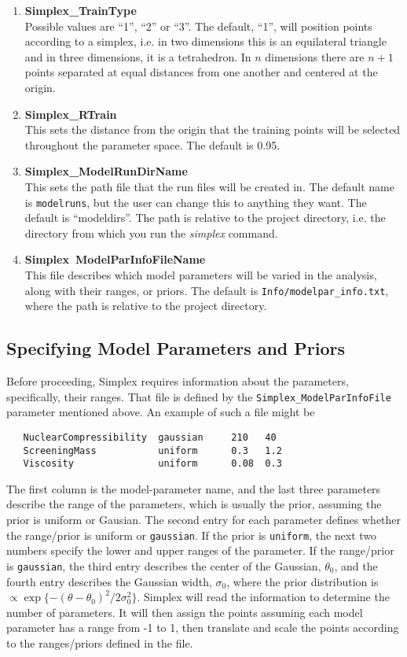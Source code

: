 \documentclass[main.tex]{subfiles}
\begin{document}
\begin{enumerate}\itemsep 0pt
    \item {\bf Simplex\_TrainType}\\
Possible values are ``1'', ``2'' or ``3''. The default, ``1'', will position points according to a simplex, i.e. in two dimensions this is an equilateral triangle and in three dimensions, it is a tetrahedron. In $n$ dimensions there are $n+1$ points separated at equal distances from one another and centered at the origin. 
\item {\bf Simplex\_RTrain}\\
This sets the distance from the origin that the training points will be selected throughout the parameter space. The default is 0.95.
\item {\bf Simplex\_ModelRunDirName}\\
This sets the path file that the run files will be created in. The default name is {\tt{modelruns}}, but the user can change this to anything they want. The default is ``modeldirs''. The path is relative to the project directory, i.e. the directory from which you run the {\it simplex} command.
\item {\bf Simplex\ ModelParInfoFileName}\\
This file describes which model parameters will be varied in the analysis, along with their ranges, or priors. The default is {\tt Info/modelpar\_info.txt}, where the path is relative to the project directory.
\end{enumerate}

\subsection{Specifying Model Parameters and Priors}

Before proceeding, Simplex requires information about the parameters, specifically, their ranges. That file is defined by the {\tt Simplex\_ModelParInfoFile} parameter mentioned above. An example of such a file might be
{\tt\begin{verbatim}
   NuclearCompressibility  gaussian     210   40
   ScreeningMass           uniform      0.3   1.2
   Viscosity               uniform      0.08  0.3
\end{verbatim}
}
The first column is the model-parameter name, and the last three parameters describe the range of the parameters, which is usually the prior, assuming the prior is uniform or Gausian. The second entry for each parameter defines whether the range/prior is uniform or {\tt gaussian}. If the prior is {\tt uniform}, the next two numbers specify the lower and upper ranges of the parameter. If the range/prior is {\tt gaussian}, the third entry describes the center of the Gaussian, $\theta_0$, and the fourth entry describes the Gaussian width, $\sigma_0$, where the prior distribution is $\propto \exp\{-(\theta-\theta_0)^2/2\sigma_0^2\}$. Simplex will read the information to determine the number of parameters. It will then assign the points assuming each model parameter has a range from -1 to 1, then translate and scale the points according to the ranges/priors defined in the file.
\end{document}
